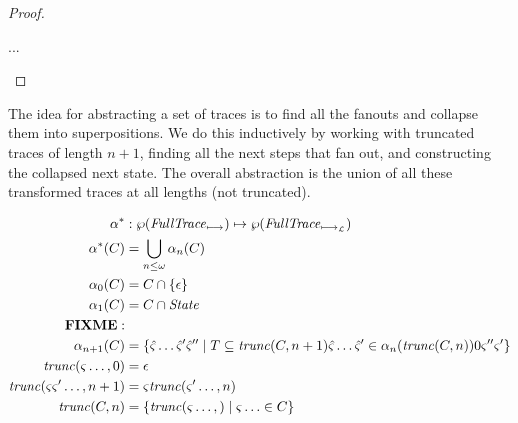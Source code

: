 \documentclass{llncs}
\begin{document}
{\begin{proof}
\begin{byCases}
{\begin{byCases}
{        ...}


  \end{byCases}
 }
\end{byCases}
\end{proof}

The idea for abstracting a set of traces is to find all the fanouts
and collapse them into superpositions. We do this inductively by
working with truncated traces of length $n+1$, finding all the next
steps that fan out, and constructing the collapsed next state. The
overall abstraction is the union of all these transformed traces at
all lengths (not truncated).

\begin{align*}
\alpha^* &: \wp(\mathit{FullTrace}_{\mathbin{\longmapsto}}) \mapsto \wp(\mathit{FullTrace}_{\mathbin{\longmapsto_{{\mathcal L}}}}) \\
\alpha^*(C) &= \bigcup\limits_{n \le \omega}\alpha_n(C) \\
\alpha_0(C) &= C \cap \{\epsilon\} \\
\alpha_1(C) &= C \cap \mathit{State} \\
\mathbf{FIXME:} &\\
\alpha_{n+1}(C) &= \{\hat{\varsigma}\ldots\hat{\varsigma}'\hat{\varsigma}'' \mid
                         T \subseteq \mathit{trunc}(C,n+1)
                         \hat{\varsigma}\ldots\hat{\varsigma}' \in \alpha_{n}(\mathit{trunc}(C,n)) 0
                         \varsigma'' \varsigma'\} \\
\mathit{trunc}(\varsigma\ldots,0) &= \epsilon \\
\mathit{trunc}(\varsigma\varsigma'\ldots,n+1) &= \varsigma\mathit{trunc}(\varsigma'\ldots,n) \\
\mathit{trunc}(C,n) &= \{\mathit{trunc}(\varsigma\ldots,) \mid \varsigma\ldots \in C\}
\end{align*}

}
\end{document}
